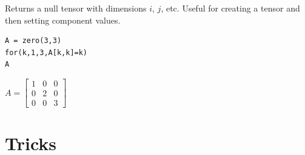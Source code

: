 \documentclass[12pt]{article}
\begin{document}
Returns a null tensor with dimensions $i$, $j$, etc.
Useful for creating a tensor and then setting component values.

{\color{blue}
\begin{verbatim}
A = zero(3,3)
for(k,1,3,A[k,k]=k)
A
\end{verbatim}
}

\noindent
$\displaystyle
A=
\begin{bmatrix}
1 & 0 & 0
\\[1ex]
0 & 2 & 0
\\[1ex]
0 & 0 & 3
\end{bmatrix}
$

\newpage

\section{Tricks}
\end{document}
